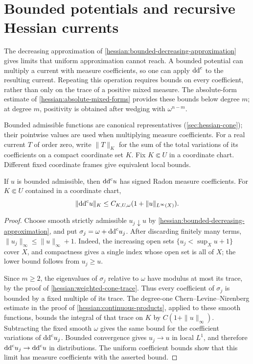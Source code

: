 \section{Bounded potentials and recursive Hessian currents}
\label{sec:hessian-bounded-currents}

The decreasing approximation of
\cref{hessian:bounded-decreasing-approximation} gives limits that
uniform approximation cannot reach. A bounded potential can
multiply a current with measure coefficients, so one can apply $\mathrm{dd}^{\mathrm{c}}$
to the resulting current. Repeating this operation requires bounds on
every coefficient, rather than only on the trace of a positive mixed
measure. The absolute-form estimate of \cref{hessian:absolute-mixed-forms}
provides these bounds below degree $m$; at degree $m$, positivity is
obtained after wedging with $\omega^{n-m}$.

Bounded admissible functions are canonical representatives
(\cref{sec:hessian-cone}); their pointwise values are used when
multiplying measure coefficients. For a real current $T$ of
order zero, write $\|T\|_K$ for the sum of the total variations of its
coefficients on a compact coordinate set $K$. Fix $K\Subset U$ in a
coordinate chart. Different fixed coordinate frames give equivalent
local bounds.

\begin{lemma}\label{hessian:bounded-zero-order}
If $u$ is bounded admissible, then $\mathrm{dd}^{\mathrm{c}} u$ has signed Radon measure
coefficients. For $K\Subset U$ contained in a coordinate chart,
\[
 \|\mathrm{dd}^{\mathrm{c}} u\|_K\leq C_{K,U,\omega}(1+\|u\|_{L^\infty(X)}).
\]
\end{lemma}
\begin{proof}
Choose smooth strictly admissible $u_j\downarrow u$ by
\cref{hessian:bounded-decreasing-approximation}, and put
$\sigma_j=\omega+\mathrm{dd}^{\mathrm{c}} u_j$. After discarding finitely many terms,
$\|u_j\|_\infty\leq\|u\|_\infty+1$. Indeed, the increasing open sets
$\{u_j<\sup_Xu+1\}$ cover $X$, and compactness gives a single index
whose open set is all of $X$; the lower bound follows from $u_j\geq u$.

Since $m\geq2$, the eigenvalues of $\sigma_j$ relative to $\omega$
have modulus at most its trace, by the proof of
\cref{hessian:weighted-cone-trace}. Thus every coefficient of
$\sigma_j$ is bounded by a fixed multiple of its trace. The
degree-one Chern--Levine--Nirenberg estimate in the proof of
\cref{hessian:continuous-products}, applied to these smooth functions,
bounds the integral of that trace on $K$ by
$C(1+\|u\|_\infty)$. Subtracting the fixed smooth $\omega$ gives the
same bound for the coefficient variations of $\mathrm{dd}^{\mathrm{c}} u_j$.
Bounded convergence gives $u_j\to u$ in local $L^1$, and therefore
$\mathrm{dd}^{\mathrm{c}} u_j\to\mathrm{dd}^{\mathrm{c}} u$ in distributions. The uniform coefficient bounds
show that this limit has measure coefficients with the asserted bound.
\end{proof}

